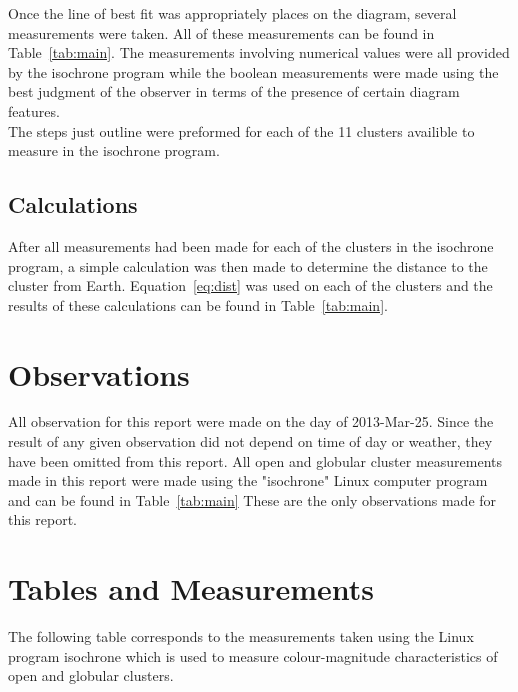 \documentclass{article}
\begin{document}
Once the line of best fit was appropriately places on the diagram, several 
measurements were taken. All of these measurements can be found in Table~\ref{tab:main}.
The measurements involving numerical values were all provided by the isochrone
program while the boolean measurements were made using the best judgment of
the observer in terms of the presence of certain diagram features.\\

The steps just outline were preformed for each of the 11 clusters availible
to measure in the isochrone program.

\subsection{Calculations}

After all measurements had been made for each of the clusters in the isochrone program,
a simple calculation was then made to determine the distance to the cluster from
Earth. Equation~\ref{eq:dist} was used on each of the clusters and the results of
these calculations can be found in Table~\ref{tab:main}.


\section{Observations}

All observation for this report were made on the day of 2013-Mar-25. Since the result
of any given observation did not depend on time of day or weather, they have been omitted
from this report. All open and globular cluster measurements made in this report were
made using the "isochrone" Linux computer program and can be found in Table~\ref{tab:main}
These are the only observations made for this report.


\section{Tables and Measurements}

The following table corresponds to the measurements taken using the Linux program
isochrone which is used to measure colour-magnitude characteristics of open and
globular clusters.
\end{document}
